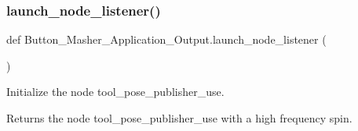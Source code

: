 \subsubsection{\texorpdfstring{launch\+\_\+node\+\_\+listener()}{launch\_node\_listener()}}
{\footnotesize\ttfamily def Button\+\_\+\+Masher\+\_\+\+Application\+\_\+\+Output.\+launch\+\_\+node\+\_\+listener (\begin{DoxyParamCaption}{ }\end{DoxyParamCaption})}



Initialize the node tool\+\_\+pose\+\_\+publisher\+\_\+use. 

\begin{DoxyReturn}{Returns}
the node tool\+\_\+pose\+\_\+publisher\+\_\+use with a high frequency spin. 
\end{DoxyReturn}
